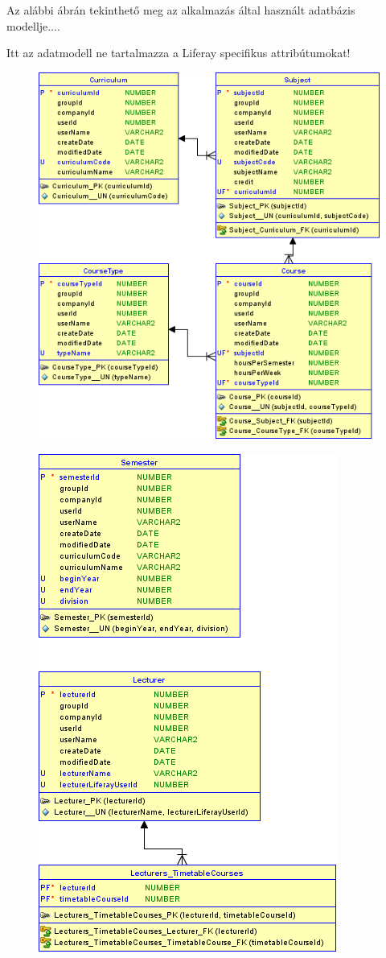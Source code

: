 \documentclass[hidelinks, 12pt, a4paper]{report}
\begin{document}
Az alábbi ábrán tekinthető meg az alkalmazás által használt adatbázis modellje....

Itt az adatmodell ne tartalmazza a Liferay specifikus attribútumokat!

\begin{figure}
    \centering
	\includegraphics{syllabus_data_model_part1.png}
\end{figure}

\begin{figure}
    \centering
	\includegraphics{syllabus_data_model_part2.png}
\end{figure}
\end{document}
